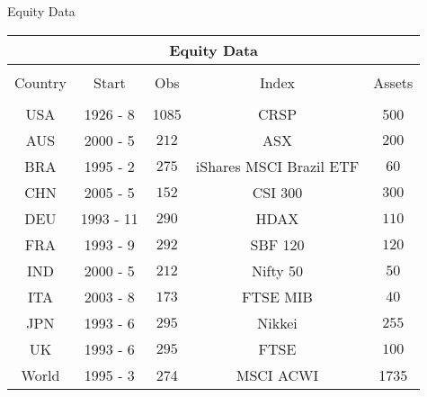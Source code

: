 \documentclass{beamer}
\begin{document}
\begin{frame}{Equity Data}
		\begin{adjustbox}{width=\textwidth}
	\begin{tabular}{ccccc}
		\multicolumn{5}{c}{Equity Data}\\
		\hline \hline \\[-1.8ex] 
		Country & Start & Obs & Index & Assets\\
		\hline\\[-1.8ex]
		USA & 1926 - 8 & 1085 & CRSP & 500\\
		AUS & 2000 - 5 & $212$& ASX & $200$ \\ 
		BRA & 1995 - 2 & $275$& iShares MSCI Brazil ETF& $60$ \\ 
		CHN & 2005 - 5 & $152$& CSI 300& $300$ \\ 
		DEU & 1993 - 11 & $290$& HDAX& $110$ \\
		FRA & 1993 - 9 & $292$& SBF 120& $120$ \\ 
		IND & 2000 - 5 & $212$& Nifty 50& $50$ \\ 
		ITA & 2003 - 8 & $173$& FTSE MIB& $40$ \\ 
		JPN & 1993 - 6 & $295$& Nikkei& $255$ \\ 
		UK & 1993 - 6 & $295$& FTSE& $100$ \\ 
		World & 1995 - 3 & 274 & MSCI ACWI & 1735\\
		\hline
	\end{tabular}
		\end{adjustbox}
\end{frame}
\end{document}
